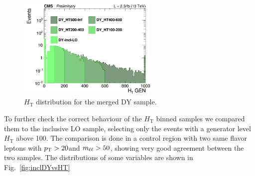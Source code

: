 \begin{figure}[htbp]
\centering
\includegraphics[width=0.6\textwidth]{../AN/Figs/log_c_incl_HTGen.png}
\caption{
    $H_\mathrm{T}$ distribution for the merged DY sample.}
    \label{fig:DY_HT}
\end{figure}


To further check the correct behaviour of the $H_\mathrm{T}$ binned samples we compared them to the inclusive LO sample, selecting only the events with a generator level $H_\mathrm{T}$ above 100\GeV. The comparison is done in a control region with two same flavor leptons with $p_{\mathrm{T}} > 20$\GeV and $m_{\ell\ell} > 50$\GeV, showing very good agreement between the two samples. The distributions of some variables are shown in Fig.~\ref{fig:inclDYvsHT}

